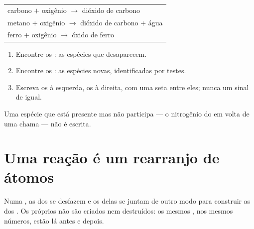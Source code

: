 \begin{example}\label{ex:g7:chemical-reactions:three}
\begin{center}
\begin{tabular}{l}
carbono $+$ oxigênio $\longrightarrow$ dióxido de carbono\\[2pt]
metano $+$ oxigênio $\longrightarrow$ dióxido de carbono $+$ água\\[2pt]
ferro $+$ oxigênio $\longrightarrow$ óxido de ferro
\end{tabular}
\end{center}
\end{example}

\begin{method}\label{met:g7:chemical-reactions:write}
\begin{enumerate}
  \item Encontre os : as espécies que desaparecem.
  \item Encontre os : as espécies novas, identificadas por
        testes.
  \item Escreva os  à esquerda, os  à direita, com uma
        seta entre eles; nunca um sinal de igual.
\end{enumerate}
Uma espécie que está presente mas não participa --- o nitrogênio do 
em volta de uma chama --- não é escrita.
\end{method}

\section{Uma reação é um rearranjo de átomos}

\begin{proposition}\label{prop:g7:chemical-reactions:rearranged}
Numa , as  dos  se desfazem e os 
delas se juntam de outro modo para construir as  dos .
Os próprios  não são criados nem destruídos: os mesmos , nos
mesmos números, estão lá antes e depois.
\end{proposition}

